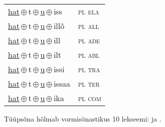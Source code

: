 \begin{minipage}{\textwidth}
\begin{sideways}
\begin{tabular}{l l}
\underline{hat}\,$\oplus$\,t\,$\oplus$\,\underline{u}\,$\oplus$\,iss & \textsc{ pl ela } \\
\underline{hat}\,$\oplus$\,t\,$\oplus$\,\underline{u}\,$\oplus$\,illõ & \textsc{ pl all } \\
\underline{hat}\,$\oplus$\,t\,$\oplus$\,\underline{u}\,$\oplus$\,ill & \textsc{ pl ade } \\
\underline{hat}\,$\oplus$\,t\,$\oplus$\,\underline{u}\,$\oplus$\,ilt & \textsc{ pl abl } \\
\underline{hat}\,$\oplus$\,t\,$\oplus$\,\underline{u}\,$\oplus$\,issi & \textsc{ pl tra } \\
\underline{hat}\,$\oplus$\,t\,$\oplus$\,\underline{u}\,$\oplus$\,issaa & \textsc{ pl ter } \\
\underline{hat}\,$\oplus$\,t\,$\oplus$\,\underline{u}\,$\oplus$\,ika & \textsc{ pl com } \\
\end{tabular}
\end{sideways}
\label{tab:tüüpsõnamall-hattu}

\end{minipage}

 
\vspace{1em}
\noindent Tüüpsõna hõlmab vormisõnastikus 10 lekseemi:  ja .
